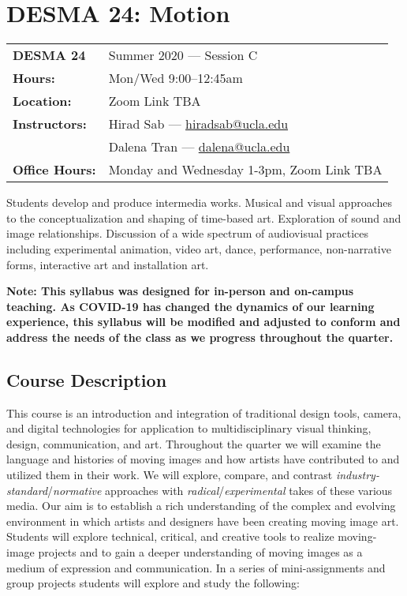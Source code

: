 \documentclass[10pt,letter,english]{article}
\begin{document}
\hypertarget{desma-24-motion}{%
      \section*{DESMA 24: Motion}\label{desma-24-motion}}

\begin{tabularx}{\textwidth}{@{}l X@{}}
      \textbf{DESMA 24}      & Summer 2020 --- Session C                                          \\
      \textbf{Hours:}        & Mon/Wed 9:00--12:45am                                              \\
      \textbf{Location:}     & Zoom Link TBA                                                      \\
      \textbf{Instructors:}  & Hirad Sab --- \href{mailto:hiradsab@ucla.edu}{{hiradsab@ucla.edu}} \\
                             & Dalena Tran --- \href{mailto:dalena@ucla.edu}{{dalena@ucla.edu}}   \\
      \textbf{Office Hours:} & Monday and Wednesday 1-3pm, Zoom Link TBA
\end{tabularx}

Students develop and produce intermedia works. Musical and visual approaches to the conceptualization and shaping of time-based art. Exploration of sound and image relationships. Discussion of a wide spectrum of audiovisual practices including experimental animation, video art, dance, performance, non-narrative forms, interactive art and installation art.

      {\small \tableofcontents}

\textbf{Note: This syllabus was designed for in-person and on-campus teaching. As COVID-19 has changed the dynamics of our learning experience, this syllabus will be modified and adjusted to conform and address the needs of the class as we progress throughout the quarter.}

\hypertarget{course-description}{%
      \subsection{Course Description}\label{course-description}}

This course is an introduction and integration of traditional design tools, camera, and digital technologies for application to multidisciplinary visual thinking, design, communication, and art. Throughout the quarter we will examine the language and histories of moving images and how artists have contributed to and utilized them in their work. We will explore, compare, and contrast \emph{industry-standard}/\emph{normative} approaches with \emph{radical}/\emph{experimental} takes of these various media. Our aim is to establish a rich understanding of the complex and evolving environment in which artists and designers have been creating moving image art. Students will explore technical, critical, and creative tools to realize moving-image projects and to gain a deeper understanding of moving images as a medium of expression and communication. In a series of mini-assignments and group projects students will explore and study the following:
\end{document}

